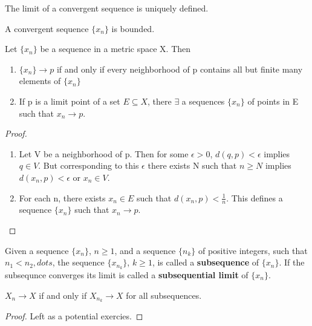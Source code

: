 \documentclass[11pt,fleqn]{book} %
\begin{document}
\begin{theorem}
	The limit of a convergent sequence is uniquely defined.
\end{theorem}

\begin{theorem}
	A convergent sequence $\{x_n\}$ is bounded.
\end{theorem}


\begin{theorem}
	Let $\{x_n\}$ be a sequence in a metric space X. Then
	\begin{enumerate}[label = \alph*)]
		\item $\{x_n\} \rightarrow p$ if and only if every neighborhood  of p contains all but finite many elements of $\{x_n\}$
		\item If p is a limit point of a set $E \subseteq X$, there $\exists$ a sequences $\{x_n\}$ of points in E such that $x_n \rightarrow p$.
	\end{enumerate}
\end{theorem}

\begin{proof}
	\begin{enumerate}[label = \alph*)]
		\item Let V be a neighborhood of p. Then for some $\epsilon > 0$, $d(q,p) < \epsilon$ implies $q \in V$. But corresponding to this $\epsilon$ there exists N such that $n \ge N $ implies $d(x_n, p) < \epsilon$ or $x_n \in V$.
		\item For each n, there exists $x_n \in E$ such that $d(x_n, p) < \frac{1}{n}$. This defines a sequence $\{x_n\}$ such that $x_n \rightarrow p$.
	\end{enumerate}
\end{proof}

\begin{definition}[Subsequence]
	Given a sequence $\{x_n\}$, $n \ge 1$, and a sequence $\{n_k\}$ of positive integers, such that $n_1 < n_2, dots$, the sequence $\{x_{n_k}\}$, $k \ge 1$, is called a \textbf{subsequence} of $\{x_n\}$. If the subsequnce converges its limit is called a \textbf{subsequential limit} of $\{x_n\}$.
\end{definition}

\begin{theorem}
	$X_n \rightarrow X $ if and only if $X_{n_k} \rightarrow X$ for all subsequences.
\end{theorem}

\begin{proof}
	Left as a potential exercies.
\end{proof}
\end{document}
